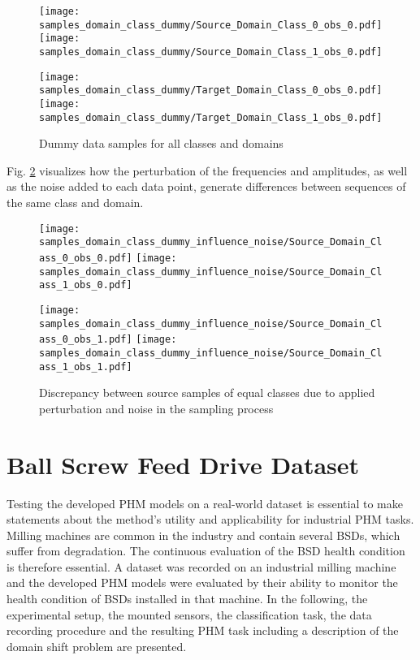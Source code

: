 \begin{figure}[H]
  \centering
  \texttt{[image: samples\_domain\_class\_dummy/Source\_Domain\_Class\_0\_obs\_0.pdf]}
  \hspace{.3cm}
  \texttt{[image: samples\_domain\_class\_dummy/Source\_Domain\_Class\_1\_obs\_0.pdf]}

  \vspace{.3cm}

  \texttt{[image: samples\_domain\_class\_dummy/Target\_Domain\_Class\_0\_obs\_0.pdf]}
  \hspace{.3cm}
  \texttt{[image: samples\_domain\_class\_dummy/Target\_Domain\_Class\_1\_obs\_0.pdf]}

  \caption{Dummy data samples for all classes and domains}
  \label{fig:samples_domain_class_dummy}
\end{figure}

Fig. \ref{fig:samples_domain_class_dummy_influence_noise} visualizes how the perturbation of the frequencies and amplitudes, as well as the noise added to each data point, generate differences between sequences of the same class and domain.

\begin{figure}[H]
  \centering
  \texttt{[image: samples\_domain\_class\_dummy\_influence\_noise/Source\_Domain\_Class\_0\_obs\_0.pdf]}
  \hspace{.3cm}
  \texttt{[image: samples\_domain\_class\_dummy\_influence\_noise/Source\_Domain\_Class\_1\_obs\_0.pdf]}

  \vspace{.3cm}

  \texttt{[image: samples\_domain\_class\_dummy\_influence\_noise/Source\_Domain\_Class\_0\_obs\_1.pdf]}
  \hspace{.3cm}
  \texttt{[image: samples\_domain\_class\_dummy\_influence\_noise/Source\_Domain\_Class\_1\_obs\_1.pdf]}

  \caption{Discrepancy between source samples of equal classes due to applied perturbation and noise in the sampling process}
  \label{fig:samples_domain_class_dummy_influence_noise}
\end{figure}

\section{Ball Screw Feed Drive Dataset} \label{sec:real_world_dataset}
Testing the developed PHM models on a real-world dataset is essential to make statements about the method's utility and applicability for industrial PHM tasks. Milling machines are common in the industry and contain several BSDs, which suffer from degradation. The continuous evaluation of the BSD health condition is therefore essential. A dataset was recorded on an industrial milling machine and the developed PHM models were evaluated by their ability to monitor the health condition of BSDs installed in that machine. In the following, the experimental setup, the mounted sensors, the classification task, the data recording procedure and the resulting PHM task including a description of the domain shift problem are presented. 

